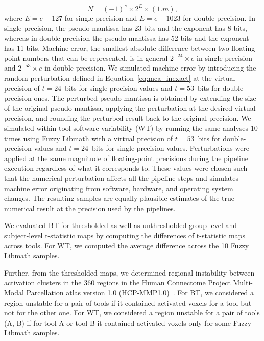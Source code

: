 \begin{equation}
  N = (-1)^s \times 2^E \times (1.m),
\end{equation}
where $E=e-127$ for single precision and $E=e-1023$ for double precision.
In single precision, the pseudo-mantissa has 23 bits and the exponent has 8 bits, whereas in
double precision the pseudo-mantissa has 52 bits and the exponent has 11 bits.
Machine error, the smallest absolute difference between two
floating-point numbers that can be represented, is in general $2^{-24}\times e$ in
single precision and $2^{-53}\times e$ in double precision.
We simulated machine error by introducing the random perturbation defined
in Equation~\ref{eq:mca_inexact} at the virtual precision of $t=24$~bits for single-precision
values and $t=53$~bits for double-precision ones. The perturbed pseudo-mantissa
is obtained by extending the size of the original pseudo-mantissa, applying the perturbation
at the desired virtual precision, and rounding the perturbed result back to the original precision.
We simulated within-tool software variability (WT) by running the same analyses 10
times using Fuzzy Libmath with a virtual precision of $t=53$~bits for
double-precision values and $t=24$~bits for single-precision values. 
Perturbations were applied at the same magnitude of floating-point precisions during the pipeline execution
regardless of what it corresponds to.
These values were chosen such that the numerical perturbation affects all the pipeline steps and simulates
machine error originating from software, hardware, and operating system changes.
The resulting samples are equally plausible estimates of
the true numerical result at the precision used by the pipelines. 

We evaluated BT for thresholded as well as unthresholded
group-level and subject-level t-statistic maps by computing the
differences of t-statistic maps across tools. For WT, we computed the
average difference across the 10 Fuzzy Libmath samples.

Further, from the thresholded maps, we determined regional instability
between activation clusters in the 360 regions in the Human Connectome
Project Multi-Modal Parcellation atlas version 1.0
(HCP-MMP1.0)~\cite{glasser2016multi}. For BT, we considered a region
unstable for a pair of tools if it contained activated voxels for a tool
but not for the other one. For WT, we considered a region unstable for a
pair of tools (A, B) if for tool A or tool B it contained activated voxels only for some Fuzzy Libmath
samples.

